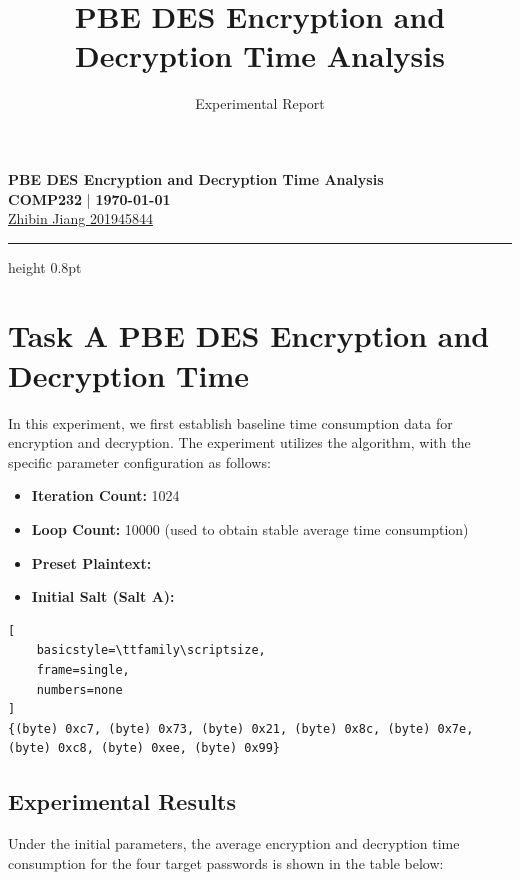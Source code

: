 \documentclass[12pt,a4paper]{article}
\title{PBE DES Encryption and Decryption Time Analysis}
\author{Experimental Report}
\date{}
\begin{document}
\begin{center}
    {\Large \textbf{PBE DES Encryption and Decryption Time Analysis}} \\[0.3em]
    \textbf{COMP232} \quad | \quad \textbf{\today} \\[0.4em]
    
    {\small 
    \href{mailto:sgzjia24@liverpool.ac.uk}{Zhibin Jiang 201945844}
    }
    
    \vspace{0.2em}
    \hrule height 0.8pt
\end{center}

\section{Task A PBE DES Encryption and Decryption Time}

In this experiment, we first establish baseline time consumption data for encryption and decryption. The experiment utilizes the  algorithm, with the specific parameter configuration as follows:

\begin{itemize}
    \item \textbf{Iteration Count:} 1024
    \item \textbf{Loop Count:} 10000 (used to obtain stable average time consumption)
    \item \textbf{Preset Plaintext:} 
    \item \textbf{Initial Salt (Salt A):}
\end{itemize}


 \begin{lstlisting}[
    basicstyle=\ttfamily\scriptsize, 
    frame=single,
    numbers=none
]
{(byte) 0xc7, (byte) 0x73, (byte) 0x21, (byte) 0x8c, (byte) 0x7e, (byte) 0xc8, (byte) 0xee, (byte) 0x99}
\end{lstlisting}


\subsection{Experimental Results}

Under the initial parameters, the average encryption and decryption time consumption for the four target passwords is shown in the table below:
\end{document}
